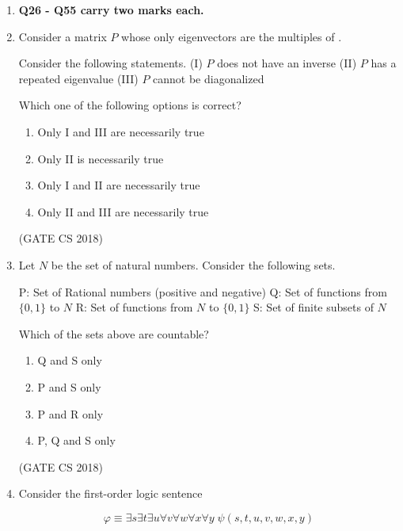 \documentclass[12pt]{article}
\begin{document}
\begin{enumerate}
(GATE CS 2018)



\item[] \textbf{Q26 - Q55 carry two marks each.}


\item Consider a matrix $P$ whose only eigenvectors are the multiples of .

Consider the following statements.  
(I) $P$ does not have an inverse  
(II) $P$ has a repeated eigenvalue  
(III) $P$ cannot be diagonalized  

Which one of the following options is correct?

\begin{multicols}{2}
\begin{enumerate}
\item Only I and III are necessarily true
\item Only II is necessarily true
\item Only I and II are necessarily true
\item Only II and III are necessarily true
\end{enumerate}
\end{multicols}

(GATE CS 2018)

\item Let $N$ be the set of natural numbers. Consider the following sets.  

P: Set of Rational numbers (positive and negative)  
Q: Set of functions from $\{0,1\}$ to $N$  
R: Set of functions from $N$ to $\{0,1\}$  
S: Set of finite subsets of $N$  

Which of the sets above are countable?  

\begin{multicols}{4}
\begin{enumerate}
\item Q and S only
\item P and S only
\item P and R only
\item P, Q and S only
\end{enumerate}
\end{multicols}

(GATE CS 2018)

\item Consider the first-order logic sentence  

$$
\varphi \equiv \exists s \exists t \exists u \forall v \forall w \forall x \forall y \; \psi(s,t,u,v,w,x,y)
$$  


\end{enumerate}
\end{document}
